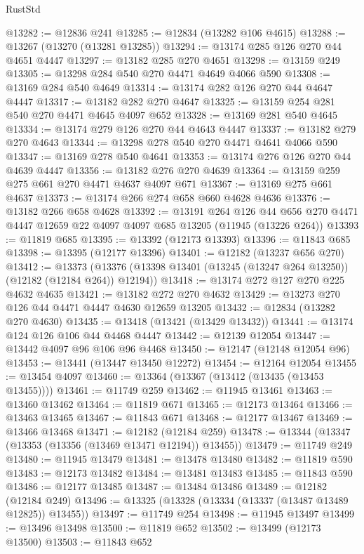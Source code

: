 \begin{lexlean}{RustStd}
\begin{coremodule}
{\begin{coremodule}
{{{{{{{{{{{{{{{{{{{{{{{{{{{{{{{{{{{{{{{{{{{{{{{{{{{{{{{{{{{{{{{{{{{{@13282 := @12836 @241
@13285 := @12834 (@13282 @106 @4615)
@13288 := @13267 (@13270 (@13281 @13285))
@13294 := @13174 @285 @126 @270 @44 @4651 @4447
@13297 := @13182 @285 @270 @4651
@13298 := @13159 @249
@13305 := @13298 @284 @540 @270 @4471 @4649 @4066 @590
@13308 := @13169 @284 @540 @4649
@13314 := @13174 @282 @126 @270 @44 @4647 @4447
@13317 := @13182 @282 @270 @4647
@13325 := @13159 @254 @281 @540 @270 @4471 @4645 @4097 @652
@13328 := @13169 @281 @540 @4645
@13334 := @13174 @279 @126 @270 @44 @4643 @4447
@13337 := @13182 @279 @270 @4643
@13344 := @13298 @278 @540 @270 @4471 @4641 @4066 @590
@13347 := @13169 @278 @540 @4641
@13353 := @13174 @276 @126 @270 @44 @4639 @4447
@13356 := @13182 @276 @270 @4639
@13364 := @13159 @259 @275 @661 @270 @4471 @4637 @4097 @671
@13367 := @13169 @275 @661 @4637
@13373 := @13174 @266 @274 @658 @660 @4628 @4636
@13376 := @13182 @266 @658 @4628
@13392 := @13191
    @264
    @126
    @44
    @656
    @270
    @4471
    @4447
    @12659
    @22
    @4097
    @4097
    @685
    @13205
    (@11945 (@13226 @264))
@13393 := @11819 @685
@13395 := @13392 (@12173 @13393)
@13396 := @11843 @685
@13398 := @13395 (@12177 @13396)
@13401 := @12182 (@13237 @656 @270)
@13412 := @13373
    (@13376 (@13398 @13401 (@13245 (@13247 @264 @13250)) (@12182 (@12184 @264)) @12194))
@13418 := @13174 @272 @127 @270 @225 @4632 @4635
@13421 := @13182 @272 @270 @4632
@13429 := @13273 @270 @126 @44 @4471 @4447 @4630 @12659 @13205
@13432 := @12834 (@13282 @270 @4630)
@13435 := @13418 (@13421 (@13429 @13432))
@13441 := @13174 @124 @126 @106 @44 @4468 @4447
@13442 := @12139 @12054
@13447 := @13442 @4097 @96 @106 @96 @4468
@13450 := @12147 (@12148 @12054 @96)
@13453 := @13441 (@13447 @13450 @12272)
@13454 := @12164 @12054
@13455 := @13454 @4097
@13460 := @13364 (@13367 (@13412 (@13435 (@13453 @13455))))
@13461 := @11749 @259
@13462 := @11945 @13461
@13463 := @13460 @13462
@13464 := @11819 @671
@13465 := @12173 @13464
@13466 := @13463 @13465
@13467 := @11843 @671
@13468 := @12177 @13467
@13469 := @13466 @13468
@13471 := @12182 (@12184 @259)
@13478 := @13344 (@13347 (@13353 (@13356 (@13469 @13471 @12194)) @13455))
@13479 := @11749 @249
@13480 := @11945 @13479
@13481 := @13478 @13480
@13482 := @11819 @590
@13483 := @12173 @13482
@13484 := @13481 @13483
@13485 := @11843 @590
@13486 := @12177 @13485
@13487 := @13484 @13486
@13489 := @12182 (@12184 @249)
@13496 := @13325 (@13328 (@13334 (@13337 (@13487 @13489 @12825)) @13455))
@13497 := @11749 @254
@13498 := @11945 @13497
@13499 := @13496 @13498
@13500 := @11819 @652
@13502 := @13499 (@12173 @13500)
@13503 := @11843 @652
}}}}}}}}}}}}}}}}}}}}}}}}}}}}}}}}}}}}}}}}}}}}}}}}}}}}}}}}}}}}}}}}}}}}
\end{coremodule}}
\end{coremodule}
\end{lexlean}
